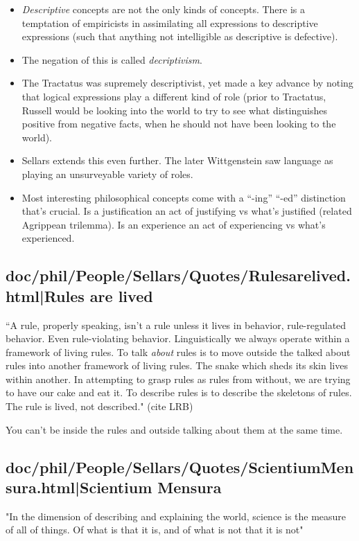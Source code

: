 \documentclass[12pt,a4paper]{report}
\begin{document}
\begin{itemize}
    \item \emph{Descriptive} concepts are not the only kinds of concepts. There
         is a temptation of empiricists in assimilating all expressions to
         descriptive expressions (such that anything not intelligible as
         descriptive is defective).
    \item The negation of this is called \emph{decriptivism}.
    \item The Tractatus was supremely descriptivist, yet made a key advance by
        noting that logical expressions play a different kind of role (prior to
        Tractatus, Russell would be looking into the world to try to see what
        distinguishes positive from negative facts, when he should not have
        been looking to the world).
    \item Sellars extends this even further. The later Wittgenstein saw
        language as playing an unsurveyable variety of roles.
    \item Most interesting philosophical concepts come with a ``-ing'' ``-ed''
        distinction that's crucial. Is a justification an act of justifying vs
        what's justified (related Agrippean trilemma). Is an experience an act
        of experiencing vs what's experienced.
\end{itemize}
\subsection{doc/phil/People/Sellars/Quotes/Rulesarelived.html|Rules are lived}
``A rule, properly speaking, isn't a rule unless it lives in behavior,
rule-regulated behavior. Even rule-violating behavior. Linguistically we always
operate within a framework of living rules. To talk \emph{about} rules is to
move outside the talked about rules into another framework of living rules. The
snake which sheds its skin lives within another. In attempting to grasp rules as
rules from without, we are trying to have our cake and eat it. To describe rules
is to describe the skeletons of rules. The rule is lived, not described."
(cite LRB)

You can't be inside the rules and outside talking about them at the same time.

\subsection{doc/phil/People/Sellars/Quotes/ScientiumMensura.html|Scientium Mensura}
"In the dimension of describing and explaining the world, science is the measure
of all of things. Of what is that it is, and of what is not that it is not"
\end{document}
